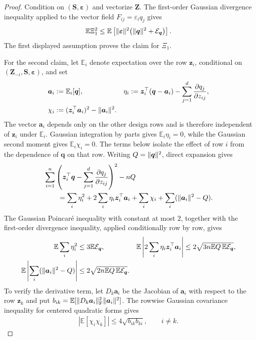 \documentclass{article}
\theoremstyle{plain}
\theoremstyle{definition}
\theoremstyle{definition}
\DeclarePairedDelimiter\norm{\lVert}{\rVert}
\def\E{{\mathbb{E}}}
\def\mathbold{\boldsymbol}
\def\ba{\mathbold{a}}\def\bfa{\mathbold{a}}\def\ahat{\widehat{a}}\def\atil{\widetilde{a}}
\def\bq{\mathbold{q}}\def\qhat{\widehat{q}}\def\qtil{\widetilde{q}}\def\qbar{{\overline q}}
\def\bS{\mathbold{S}}\def\hbS{{\widehat{\bS}}}\def\tbS{{\widetilde{\bS}}}
\def\bz{\mathbold{z}}\def\zhat{\widehat{z}}\def\ztil{\widetilde{z}}\def\zbar{{\overline z}}
\def\bZ{\mathbold{Z}}\def\hbZ{{\widehat{\bZ}}}\def\tbZ{{\widetilde{\bZ}}}
\def\ep{\varepsilon}\def\eps{\epsilon}\def\veps{\varepsilon}
\def\bep{ {\mathbold{\ep} }}
\begin{document}
\begin{proof}
Condition on $(\bS,\bep)$ and vectorize $\bZ$.  The first-order Gaussian
divergence inequality applied to the vector field
$F_{ij}=\varepsilon_iq_j$ gives
\begin{align*}
    \E\Xi_1^2
    \leq \E\left[\norm{\bep}^2
       \bigl(\norm{\bq}^2+\calE_{\bq}\bigr)\right].
\end{align*}
The first displayed assumption proves the claim for $\Xi_1$.

For the second claim, let $\E_i$ denote expectation over the row $\bz_i$,
conditional on $(\bZ_{-i},\bS,\bep)$, and set
\begin{align*}
    \ba_i&:=\E_i[\bq],
    & \eta_i&:=\bz_i^\top(\bq-\ba_i)
       -\sum_{j=1}^d\pdv{q_j}{z_{ij}},\\
    \chi_i&:=(\bz_i^\top\ba_i)^2-\norm{\ba_i}^2.
\end{align*}
The vector $\ba_i$ depends only on the other design rows and is
therefore independent of $\bz_i$ under $\E_i$. Gaussian integration by
parts gives $\E_i\eta_i=0$, while the Gaussian second moment gives
$\E_i\chi_i=0$. The terms below isolate the effect of row $i$ from
the dependence of $\bq$ on that row.
Writing $Q=\norm{\bq}^2$, direct expansion gives
\begin{align*}
    &\sum_{i=1}^n\left(
       \bz_i^\top\bq-\sum_{j=1}^d\pdv{q_j}{z_{ij}}
    \right)^2-nQ\\
    &\qquad=\sum_i\eta_i^2
       +2\sum_i\eta_i\bz_i^\top\ba_i
       +\sum_i\chi_i
       +\sum_i(\norm{\ba_i}^2-Q).
\end{align*}
The Gaussian Poincar\'e inequality with constant at most $2$, together with the
first-order divergence inequality, applied conditionally row by row, gives
\begin{align*}
    \E\sum_i\eta_i^2
       &\leq3\E\calE_{\bq},
    &
    \E\left|2\sum_i\eta_i\bz_i^\top\ba_i\right|
       &\leq2\sqrt{3n\E Q\,\E\calE_{\bq}},
    \\
    \E\left|\sum_i(\norm{\ba_i}^2-Q)\right|
       &\leq2\sqrt{2n\E Q\,\E\calE_{\bq}}.
\end{align*}
To verify the derivative term, let $D_k\ba_i$ be the Jacobian of $\ba_i$ with respect
to the row $\bz_k$ and put
$b_{ik}=\E[\norm{D_k\ba_i}_{\rm F}^2\norm{\ba_i}^2]$.
The rowwise Gaussian covariance inequality for centered quadratic forms gives
\begin{align*}
    |\E[\chi_i\chi_k]|
       \leq4\sqrt{b_{ik}b_{ki}},\qquad i\ne k.
\end{align*}

\end{proof}
\end{document}
